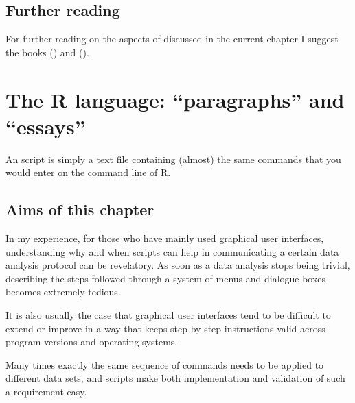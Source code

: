 \documentclass[krantz2]{krantz}\usepackage{knitr}%
\newcommand{\href}[2]{\emph{#2} (\url{#1})}
\begin{document}
\section{Further reading}
For further reading on the aspects of \Rlang discussed in the current chapter I suggest the books  (\citeauthor{Peng2016}) and  (\citeauthor{Matloff2011}).











\chapter{The R language: ``paragraphs'' and ``essays''}\label{chap:R:scripts}

\begin{VF}
An \Rlang script is simply a text file containing (almost) the same commands that you would enter on the command line of R.

\end{VF}


\section{Aims of this chapter}

In my experience, for those who have mainly used graphical user interfaces, understanding why and when scripts can help in communicating a certain data analysis protocol can be revelatory. As soon as a data analysis stops being trivial, describing the steps followed through a system of menus and dialogue boxes becomes extremely tedious.

It is also usually the case that graphical user interfaces tend to be difficult to extend or improve in a way that keeps step-by-step instructions valid across program versions and operating systems.

Many times exactly the same sequence of commands needs to be applied to different data sets, and scripts make both implementation and validation of such a requirement easy.
\end{document}
